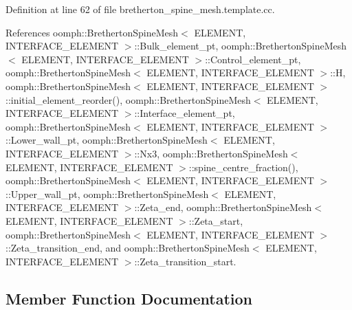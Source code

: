 Definition at line 62 of file bretherton\+\_\+spine\+\_\+mesh.\+template.\+cc.



References oomph\+::\+Bretherton\+Spine\+Mesh$<$ E\+L\+E\+M\+E\+N\+T, I\+N\+T\+E\+R\+F\+A\+C\+E\+\_\+\+E\+L\+E\+M\+E\+N\+T $>$\+::\+Bulk\+\_\+element\+\_\+pt, oomph\+::\+Bretherton\+Spine\+Mesh$<$ E\+L\+E\+M\+E\+N\+T, I\+N\+T\+E\+R\+F\+A\+C\+E\+\_\+\+E\+L\+E\+M\+E\+N\+T $>$\+::\+Control\+\_\+element\+\_\+pt, oomph\+::\+Bretherton\+Spine\+Mesh$<$ E\+L\+E\+M\+E\+N\+T, I\+N\+T\+E\+R\+F\+A\+C\+E\+\_\+\+E\+L\+E\+M\+E\+N\+T $>$\+::H, oomph\+::\+Bretherton\+Spine\+Mesh$<$ E\+L\+E\+M\+E\+N\+T, I\+N\+T\+E\+R\+F\+A\+C\+E\+\_\+\+E\+L\+E\+M\+E\+N\+T $>$\+::initial\+\_\+element\+\_\+reorder(), oomph\+::\+Bretherton\+Spine\+Mesh$<$ E\+L\+E\+M\+E\+N\+T, I\+N\+T\+E\+R\+F\+A\+C\+E\+\_\+\+E\+L\+E\+M\+E\+N\+T $>$\+::\+Interface\+\_\+element\+\_\+pt, oomph\+::\+Bretherton\+Spine\+Mesh$<$ E\+L\+E\+M\+E\+N\+T, I\+N\+T\+E\+R\+F\+A\+C\+E\+\_\+\+E\+L\+E\+M\+E\+N\+T $>$\+::\+Lower\+\_\+wall\+\_\+pt, oomph\+::\+Bretherton\+Spine\+Mesh$<$ E\+L\+E\+M\+E\+N\+T, I\+N\+T\+E\+R\+F\+A\+C\+E\+\_\+\+E\+L\+E\+M\+E\+N\+T $>$\+::\+Nx3, oomph\+::\+Bretherton\+Spine\+Mesh$<$ E\+L\+E\+M\+E\+N\+T, I\+N\+T\+E\+R\+F\+A\+C\+E\+\_\+\+E\+L\+E\+M\+E\+N\+T $>$\+::spine\+\_\+centre\+\_\+fraction(), oomph\+::\+Bretherton\+Spine\+Mesh$<$ E\+L\+E\+M\+E\+N\+T, I\+N\+T\+E\+R\+F\+A\+C\+E\+\_\+\+E\+L\+E\+M\+E\+N\+T $>$\+::\+Upper\+\_\+wall\+\_\+pt, oomph\+::\+Bretherton\+Spine\+Mesh$<$ E\+L\+E\+M\+E\+N\+T, I\+N\+T\+E\+R\+F\+A\+C\+E\+\_\+\+E\+L\+E\+M\+E\+N\+T $>$\+::\+Zeta\+\_\+end, oomph\+::\+Bretherton\+Spine\+Mesh$<$ E\+L\+E\+M\+E\+N\+T, I\+N\+T\+E\+R\+F\+A\+C\+E\+\_\+\+E\+L\+E\+M\+E\+N\+T $>$\+::\+Zeta\+\_\+start, oomph\+::\+Bretherton\+Spine\+Mesh$<$ E\+L\+E\+M\+E\+N\+T, I\+N\+T\+E\+R\+F\+A\+C\+E\+\_\+\+E\+L\+E\+M\+E\+N\+T $>$\+::\+Zeta\+\_\+transition\+\_\+end, and oomph\+::\+Bretherton\+Spine\+Mesh$<$ E\+L\+E\+M\+E\+N\+T, I\+N\+T\+E\+R\+F\+A\+C\+E\+\_\+\+E\+L\+E\+M\+E\+N\+T $>$\+::\+Zeta\+\_\+transition\+\_\+start.



\subsection{Member Function Documentation}
\mbox{\label{classoomph_1_1BrethertonSpineMesh_a2fc2b4be08ff93fa313281f82e19d92e}} 
